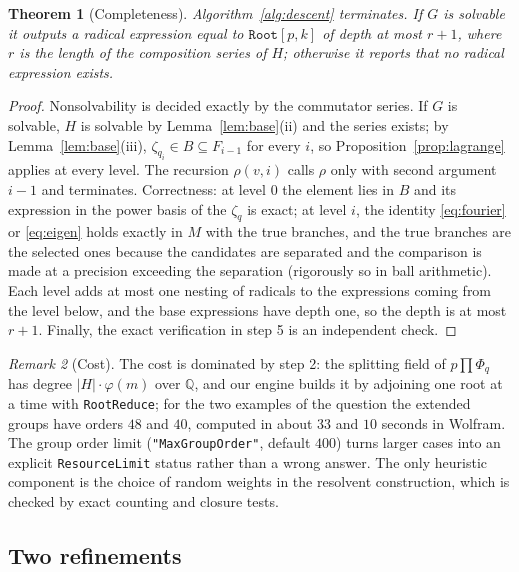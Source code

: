 \documentclass[11pt,a4paper]{article}
\newtheorem{theorem}{Theorem}[section]
\theoremstyle{definition}
\theoremstyle{remark}
\newtheorem{remark}[theorem]{Remark}
\newcommand{\Q}{\mathbb{Q}}
\newcommand{\code}[1]{\texttt{#1}}
\newcommand{\Root}{\code{Root}}
\begin{document}
\begin{theorem}[Completeness]\label{thm:complete}
Algorithm~\ref{alg:descent} terminates.  If $G$ is solvable it outputs a radical
expression equal to $\Root[p,k]$ of depth at most $r+1$, where $r$ is the length of the
composition series of $H$; otherwise it reports that no radical expression exists.
\end{theorem}

\begin{proof}
Nonsolvability is decided exactly by the commutator series.  If $G$ is solvable, $H$ is
solvable by Lemma~\ref{lem:base}(ii) and the series exists; by Lemma~\ref{lem:base}(iii),
$\zeta_{q_i}\in B\subseteq F_{i-1}$ for every $i$, so Proposition~\ref{prop:lagrange}
applies at every level.  The recursion $\rho(v,i)$ calls $\rho$ only with second argument
$i-1$ and terminates.  Correctness: at level $0$ the element lies in $B$ and its
expression in the power basis of the $\zeta_q$ is exact; at level $i$, the identity
\eqref{eq:fourier} or \eqref{eq:eigen} holds exactly in $M$ with the true branches, and
the true branches are the selected ones because the candidates are separated and the
comparison is made at a precision exceeding the separation (rigorously so in ball
arithmetic).  Each level adds at most one nesting of radicals to the expressions coming
from the level below, and the base expressions have depth one, so the depth is at most
$r+1$.  Finally, the exact verification in step 5 is an independent check.
\end{proof}

\begin{remark}[Cost]
The cost is dominated by step 2: the splitting field of $p\prod\Phi_q$ has degree
$|H|\cdot\varphi(m)$ over $\Q$, and our engine builds it by adjoining one root at a
time with \code{RootReduce}; for the two examples of the question the extended groups
have orders $48$ and $40$, computed in about $33$ and $10$ seconds in Wolfram.  The
group order limit (\code{"MaxGroupOrder"}, default $400$) turns larger cases into an
explicit \code{ResourceLimit} status rather than a wrong answer.  The only heuristic
component is the choice of random weights in the resolvent construction, which is
checked by exact counting and closure tests.
\end{remark}

\subsection{Two refinements}\label{sec:refinements}
\end{document}
